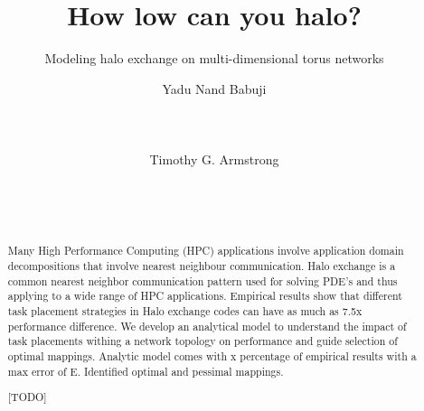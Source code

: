 \documentclass{acm_proc_article-sp}
\begin{document}
\setlength{\pdfpageheight}{\paperheight}
\setlength{\pdfpagewidth}{\paperwidth}


\newcommand{\timnote}[1]{ {\textcolor{maroon} { Tim: #1 }}}

\title{How low can you halo?}
\subtitle{Modeling halo exchange on multi-dimensional torus networks}


\author{
\alignauthor
Yadu Nand Babuji\\
       \\
       \\
       \\
\alignauthor
Timothy G. Armstrong\\
       \\
       \\
       \\
}
\maketitle

\begin{abstract}
Many High Performance Computing (HPC) applications involve application domain decompositions that involve nearest neighbour communication.
Halo exchange is a common nearest neighbor communication pattern used for solving PDE's and thus applying to a wide range of HPC applications.
Empirical results show that different task placement strategies in Halo exchange codes can have as much as 7.5x performance difference.
We develop an analytical model to understand the impact of task placements withing a network topology on performance and guide selection of
optimal mappings.
Analytic model comes with x percentage of empirical results with a max error of E.
Identified optimal and pessimal mappings.


[TODO]
\end{abstract}
\end{document}
